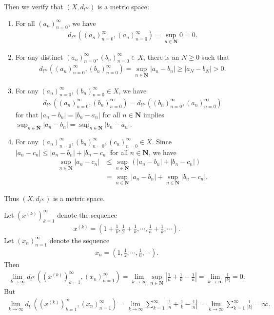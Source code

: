 \documentclass{book}
\begin{document}
Then we verify that $(X,d_{l^\infty})$ is a metric space:

\begin{enumerate}
    \item For all $(a_n)_{n=0}^{\infty}$, we have
        \begin{align*}
            d_{l^\infty}((a_n)_{n=0}^{\infty},(a_n)_{n=0}^{\infty})=\sup_{n\in\mathbf{N}}0=0.
        \end{align*}
    \item For any distinct $(a_n)_{n=0}^{\infty},(b_n)_{n=0}^{\infty}\in X$, there is an $N\geq 0$ such that
        \begin{align*}
            d_{l^\infty}((a_n)_{n=0}^{\infty},(b_n)_{n=0}^{\infty})=\sup_{n\in\mathbf{N}}|a_n-b_n|\geq|a_N-b_N|>0.
        \end{align*}
    \item For any $(a_n)_{n=0}^{\infty},(b_n)_{n=0}^{\infty}\in X$, we have
        \begin{align*}
            d_{l^\infty}((a_n)_{n=0}^{\infty},(b_n)_{n=0}^{\infty})=d_{l^\infty}((b_n)_{n=0}^{\infty},(a_n)_{n=0}^{\infty})
        \end{align*}
    for that $|a_n-b_n|=|b_n-a_n|$ for all $n\in\mathbf{N}$ implies $\sup_{n\in\mathbf{N}}|a_n-b_n|=\sup_{n\in\mathbf{N}}|b_n-a_n|$.
    \item For any $(a_n)_{n=0}^{\infty},(b_n)_{n=0}^{\infty},(c_n)_{n=0}^{\infty}\in X$. Since $|a_n-c_n|\leq|a_n-b_n|+|b_n-c_n|$ for all $n\in\mathbf{N}$, we have
        \begin{align*}
            \sup_{n\in\mathbf{N}}|a_n-c_n|
            &\leq\sup_{n\in\mathbf{N}}(|a_n-b_n|+|b_n-c_n|)\\
            &=\sup_{n\in\mathbf{N}}|a_n-b_n|+\sup_{n\in\mathbf{N}}|b_n-c_n|.
        \end{align*}
\end{enumerate}
Thus $(X,d_{l^\infty})$ is a metric space.

Let $(x^{(k)})_{k=1}^{\infty}$ denote the sequence
    \begin{align*}
        x^{(k)}=\left(1+\frac{1}{k},\frac{1}{2}+\frac{1}{k},\cdots,\frac{1}{n}+\frac{1}{k},\cdots\right).
    \end{align*}
Let $(x_n)_{n=1}^{\infty}$ denote the sequence
    \begin{align*}
        x_n=\left(1,\frac{1}{2},\cdots,\frac{1}{n},\cdots\right).
    \end{align*}
Then
    \begin{align*}
        \lim_{k\to\infty}d_{l^\infty}((x^{(k)})_{k=1}^{\infty},(x_n)_{n=1}^{\infty})=\lim_{k\to\infty}\sup_{n\in\mathbf{N}}\left|\frac{1}{n}+\frac{1}{k}-\frac{1}{n}\right|=\lim_{k\to\infty}\frac{1}{|k|}=0.
    \end{align*}
But
    \begin{align*}
        \lim_{k\to\infty}d_{l^1}((x^{(k)})_{k=1}^{\infty},(x_n)_{n=1}^{\infty})
        =\lim_{k\to\infty}\sum_{k=1}^{\infty}\left|\frac{1}{n}+\frac{1}{k}-\frac{1}{n}\right|
        =\lim_{k\to\infty}\sum_{k=1}^{\infty}\frac{1}{|k|}=\infty.
    \end{align*}
\end{document}
